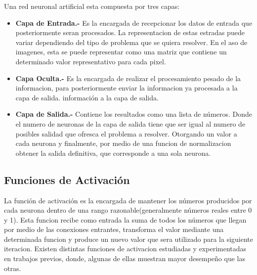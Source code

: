 Una red neuronal artificial esta compuesta por tres capas:
\begin{itemize}
\item \textbf{Capa de Entrada.- }Es la encargada de recepcionar los datos de entrada que posteriormente seran procesados. La representacion de estas estradas puede variar dependiendo del tipo de problema que se quiera resolver. En el aso de imagenes, esta se puede representar como una matriz que contiene un determinado valor representativo para cada pixel.
\item \textbf{Capa Oculta.- }Es la encargada de realizar el procesamiento pesado de la informacion, para posteriormente enviar la informacion ya procesada a la capa de salida.
información a la capa de salida.
\item \textbf{Capa de Salida.-} Contiene los resultados como una lista de números. Donde el numero de neuronas de la capa de salida tiene que ser igual al numero de posibles salidad que ofresca el problema a resolver. Otorgando un valor a cada neurona y finalmente, por medio de una funcion de normalizacion obtener la salida definitiva, que corresponde a una sola neurona.  
\end{itemize}


\subsection{Funciones de Activación}
La función de activación es la encargada de mantener los números producidos por cada neurona dentro de una rango razonable(generalmente números reales entre 0 y 1). Esta funcion recibe como entrada la suma de todos los números que llegan por medio de las conexiones entrantes, transforma el valor mediante una determinada funcion y produce un nuevo valor que sera utilizado para la siguiente iteracion. Existen distintas funciones de activacion estudiadas y experimentadas en trabajos previos, donde, algunas de ellas muestran mayor desempeño que las otras.

